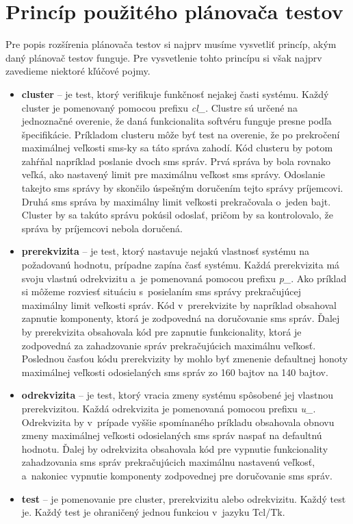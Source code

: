 \section{Princíp použitého plánovača testov} 
\label{sekcia:princip_pouziteho_planovaca}
Pre popis rozšírenia plánovača testov si najprv musíme vysvetliť princíp, 
akým daný plánovač testov funguje. Pre vysvetlenie tohto princípu si 
však najprv zavedieme niektoré kľúčové pojmy.

\begin{itemize}
\item \textbf{cluster} -- je test, ktorý verifikuje funkčnosť nejakej 
časti systému. Každý cluster je pomenovaný pomocou prefixu \emph{cl\_}. 
Clustre sú určené na jednoznačné overenie, že daná funkcionalita softvéru
funguje presne podľa špecifikácie. Príkladom clusteru môže byť test na
overenie, že po prekročení maximálnej veľkosti sms-ky sa táto správa 
zahodí. Kód clusteru by potom zahŕňal napríklad poslanie dvoch sms správ.
Prvá správa by bola rovnako veľká, ako nastavený limit pre maximálnu 
veľkost sms správy. 
Odoslanie takejto sms správy by skončilo úspešným doručením tejto správy
príjemcovi. 
Druhá sms správa by maximálny limit veľkosti prekračovala o~jeden bajt.
Cluster by sa takúto správu pokúsil odoslať, pričom by sa kontrolovalo,
že správa by príjemcovi nebola doručená.
\item \textbf{prerekvizita} -- je test, ktorý nastavuje nejakú vlastnosť 
systému na požadovanú hodnotu, prípadne zapína časť systému. 
Každá prerekvizita má svoju vlastnú odrekvizitu a~je pomenovaná pomocou 
prefixu \emph{p\_}. Ako príklad si môžeme rozviesť situáciu s~posielaním
sms správy prekračujúcej maximálny limit veľkosti správ. Kód v~prerekvizite
by napríklad obsahoval zapnutie komponenty, ktorá je zodpovedná na doručovanie
sms správ. Ďalej by prerekvizita obsahovala kód pre zapnutie funkcionality,
ktorá je zodpovedná za zahadzovanie správ prekračujúcich maximálnu veľkosť.
Poslednou časťou kódu prerekvizity by mohlo byť zmenenie defaultnej honoty
maximálnej veľkosti odosielaných sms správ zo 160 bajtov na 140 bajtov.
\item \textbf{odrekvizita} -- je test, ktorý vracia zmeny systému 
spôsobené jej vlastnou prerekvizitou. Každá odrekvizita je pomenovaná
pomocou prefixu \emph{u\_}. Odrekvizita by v~prípade vyššie spomínaného 
príkladu obsahovala obnovu zmeny maximálnej veľkosti odosielaných sms správ
naspať na defaultnú hodnotu. Ďalej by odrekvizita obsahovala kód pre vypnutie 
funkcionality zahadzovania sms správ prekračujúcich maximálnu nastavenú 
veľkosť, a~nakoniec vypnutie komponenty zodpovednej pre doručovanie sms 
správ.
\item \textbf{test} -- je pomenovanie pre cluster, prerekvizitu alebo 
odrekvizitu. Každý test je. Každý test je ohraničený jednou funkciou
v~jazyku Tcl/Tk. 

\end{itemize}

